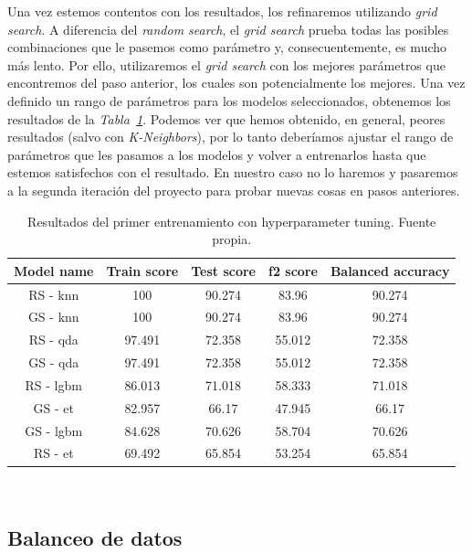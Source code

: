 Una vez estemos contentos con los resultados, los refinaremos utilizando \textit{grid search}. A diferencia del \textit{random search}, el \textit{grid search} prueba todas
las posibles combinaciones que le pasemos como parámetro y, consecuentemente, es mucho más lento. Por ello, utilizaremos el \textit{grid search} con los mejores parámetros que
encontremos del paso anterior, los cuales son potencialmente los mejores. Una vez definido un rango de parámetros para los modelos seleccionados, obtenemos los resultados
de la \textit{Tabla\ \ref{tab:hyperparameter-tuning-results}}. Podemos ver que hemos obtenido, en general, peores resultados (salvo con \textit{K-Neighbors}), por lo tanto
deberíamos ajustar el rango de parámetros que les pasamos a los modelos y volver a entrenarlos hasta que estemos satisfechos con el resultado. En nuestro caso no lo haremos
y pasaremos a la segunda iteración del proyecto para probar nuevas cosas en pasos anteriores.

\begin{table}[!h]
    \centering
    \begin{tabular}{|c|cccc|}
        \hline
        Model name & Train score & Test score & f2 score & Balanced accuracy \\ \hline
        RS - knn & 100 & 90.274 & 83.96 & 90.274 \\
        GS - knn & 100 & 90.274 & 83.96 & 90.274 \\
        RS - qda & 97.491 & 72.358 & 55.012 & 72.358 \\
        GS - qda & 97.491 & 72.358 & 55.012 & 72.358 \\
        RS - lgbm & 86.013 & 71.018 & 58.333 & 71.018 \\
        GS - et & 82.957 & 66.17 & 47.945 & 66.17 \\
        GS - lgbm & 84.628 & 70.626 & 58.704 & 70.626 \\
        RS - et & 69.492 & 65.854 & 53.254 & 65.854 \\ \hline
        \end{tabular}
    
    \caption{Resultados del primer entrenamiento con hyperparameter tuning. Fuente propia.}\ \label{tab:hyperparameter-tuning-results}
\end{table}
\clearpage

\subsection{Balanceo de datos}\ \label{sec:i2-balance}

